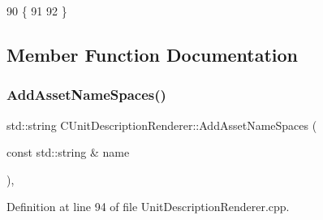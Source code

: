 \begin{DoxyCode}
90                                                    \{
91     
92 \}
\end{DoxyCode}


\subsection{Member Function Documentation}
\hypertarget{classCUnitDescriptionRenderer_ae18d6862ae305bd5633558f86457270b}{}\label{classCUnitDescriptionRenderer_ae18d6862ae305bd5633558f86457270b} 
\subsubsection{\texorpdfstring{Add\+Asset\+Name\+Spaces()}{AddAssetNameSpaces()}}
{\footnotesize\ttfamily std\+::string C\+Unit\+Description\+Renderer\+::\+Add\+Asset\+Name\+Spaces (\begin{DoxyParamCaption}\item[{const std\+::string \&}]{name }\end{DoxyParamCaption})\hspace{0.3cm}{\ttfamily [static]}, {\ttfamily [protected]}}



Definition at line 94 of file Unit\+Description\+Renderer.\+cpp.


